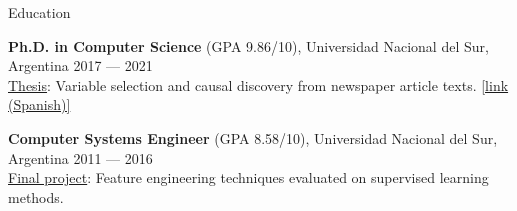 \documentclass{resume} %
\begin{document}
\vspace{-0.1cm}
\begin{rSection}{Education}

{\bf Ph.D. in Computer Science} (GPA 9.86/10), Universidad Nacional del Sur, Argentina \hfill {2017 --- 2021}\\
\underline{Thesis}: Variable selection and causal discovery from  newspaper article texts. \href{https://repositoriodigital.uns.edu.ar/bitstream/handle/123456789/5827/MAISONNAVE\%20M._TESIS.pdf?sequence=2&isAllowed=y}{[link (Spanish)]}\\

\vspace{-0.6cm}


{\bf Computer Systems Engineer} (GPA 8.58/10), Universidad Nacional del Sur, Argentina \hfill {2011 --- 2016}\\
\underline{Final project}: Feature engineering techniques evaluated on supervised learning methods.


\end{rSection}

\end{document}
